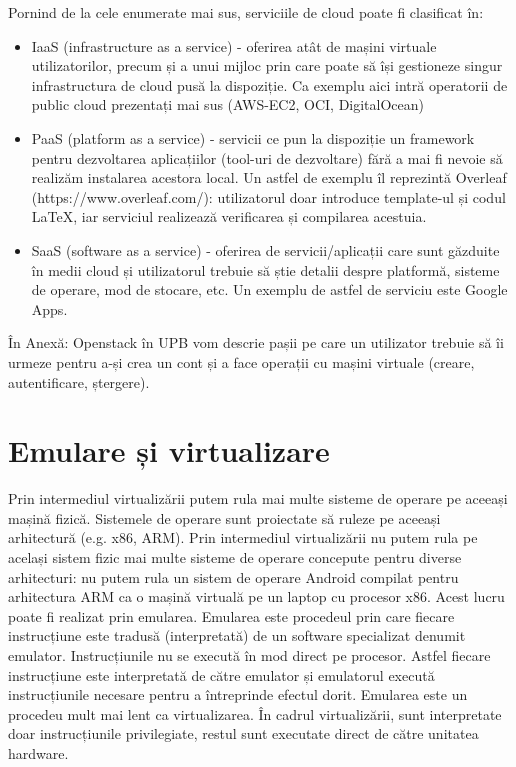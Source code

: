 Pornind de la cele enumerate mai sus, serviciile de cloud poate fi clasificat în:

\begin{itemize}
	\item IaaS (infrastructure as a service) - oferirea atât de mașini
		virtuale utilizatorilor, precum și a unui mijloc prin care poate
		să își gestioneze singur infrastructura de cloud pusă la
		dispoziție. Ca exemplu aici intră operatorii de public cloud
		prezentați mai sus (AWS-EC2, OCI, DigitalOcean)
	\item PaaS (platform as a service) - servicii ce pun la dispoziție un
		framework pentru dezvoltarea aplicațiilor (tool-uri de
		dezvoltare) fără a mai fi nevoie să realizăm instalarea acestora
		local. Un astfel de exemplu îl reprezintă Overleaf
		(https://www.overleaf.com/): utilizatorul doar introduce
		template-ul și codul LaTeX, iar serviciul realizează verificarea
		și compilarea acestuia.
	\item SaaS (software as a service) - oferirea de servicii/aplicații care
		sunt găzduite în medii cloud și utilizatorul trebuie să știe
		detalii despre platformă, sisteme de operare, mod de stocare,
		etc. Un exemplu de astfel de serviciu este Google Apps.
\end{itemize}


În Anexă: Openstack în UPB vom descrie pașii pe care un utilizator trebuie să îi
urmeze pentru a-și crea un cont și a face operații cu mașini virtuale (creare,
autentificare, ștergere).

\section{Emulare și virtualizare}
\label{sec:vm-emulation}

Prin intermediul virtualizării putem rula mai multe sisteme de operare pe
aceeași mașină fizică. Sistemele de operare sunt proiectate să ruleze pe aceeași
arhitectură (e.g. x86, ARM). Prin intermediul virtualizării nu putem rula pe
același sistem fizic mai multe sisteme de operare concepute pentru diverse
arhitecturi: nu putem rula un sistem de operare Android compilat pentru
arhitectura ARM ca o mașină virtuală pe un laptop cu procesor x86. Acest lucru
poate fi realizat prin emularea. Emularea este procedeul prin care fiecare
instrucțiune este tradusă (interpretată) de un software specializat denumit
emulator. Instrucțiunile nu se execută în mod direct pe procesor. Astfel fiecare
instrucțiune este interpretată de către emulator și emulatorul execută
instrucțiunile necesare pentru a întreprinde efectul dorit. Emularea este un
procedeu mult mai lent ca virtualizarea. În cadrul virtualizării, sunt
interpretate doar instrucțiunile privilegiate, restul sunt executate direct de
către unitatea hardware.


